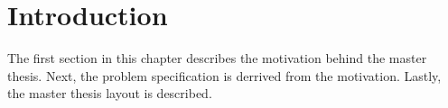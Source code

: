\chapter{Introduction}
\label{ch:introduction}
The first section in this chapter describes the motivation behind the master thesis.
Next, the problem specification is derrived from the motivation.
Lastly, the master thesis layout is described.




